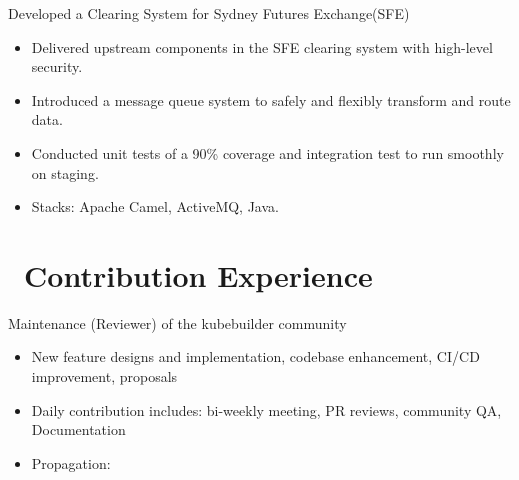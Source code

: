 \documentclass{resume}
\begin{document}

Developed a Clearing System for Sydney Futures Exchange(SFE)
\begin{itemize}
  \item Delivered upstream components in the SFE clearing system with high-level security.
  \item Introduced a message queue system to safely and flexibly transform and route data.
  \item Conducted unit tests of a 90\% coverage and integration test to run smoothly on staging.
  \item Stacks: Apache Camel, ActiveMQ, Java.
\end{itemize}

\section{\faUsers\ Contribution Experience}

Maintenance (Reviewer) of the kubebuilder community
\begin{itemize}
  \item New feature designs and implementation, codebase enhancement, CI/CD improvement, proposals
  \item Daily contribution includes: bi-weekly meeting, PR reviews, community QA, Documentation
  \item Propagation:
     \textperiodcentered\
     \textperiodcentered\
\end{itemize}
\end{document}
